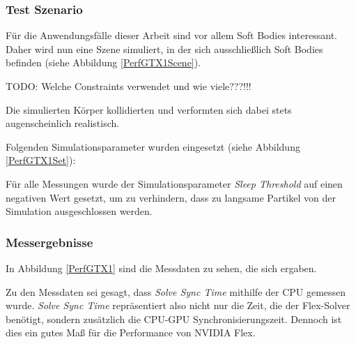 \subsubsection{Test Szenario}

Für die Anwendungsfälle dieser Arbeit sind vor allem Soft Bodies interessant. Daher wird nun eine Szene simuliert, in der sich ausschließlich Soft Bodies befinden (siehe Abbildung \ref{PerfGTX1Scene}). 

TODO: Welche Constraints verwendet und wie viele???!!!


Die simulierten Körper kollidierten und verformten sich dabei stets augenscheinlich realistisch.

Folgenden Simulationsparameter wurden eingesetzt (siehe Abbildung \ref{PerfGTX1Set}):


Für alle Messungen wurde der Simulationsparameter \textit{Sleep Threshold} auf einen negativen Wert gesetzt, um zu verhindern, dass zu langsame Partikel von der Simulation ausgeschlossen werden.


\subsubsection{Messergebnisse}


In Abbildung \ref{PerfGTX1} sind die Messdaten zu sehen, die sich ergaben.


Zu den Messdaten sei gesagt, dass \textit{Solve Sync Time} mithilfe der CPU gemessen wurde. \textit{Solve Sync Time} repräsentiert also nicht nur die Zeit, die der Flex-Solver benötigt, sondern zusätzlich die CPU-GPU Synchronisierungszeit. Dennoch ist dies ein gutes Maß für die Performance von NVIDIA Flex. 

